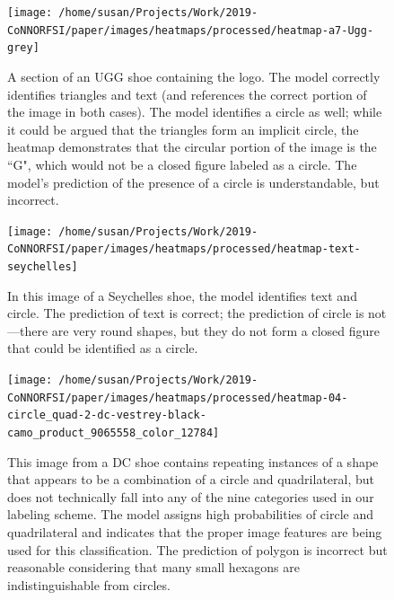 \documentclass{article}\usepackage[]{graphicx}\usepackage[table]{xcolor}
\newenvironment{knitrout}{}{} %
\begin{document}
\begin{knitrout}
\color{fgcolor}\begin{figure}[!p]

{\centering \texttt{[image: /home/susan/Projects/Work/2019-CoNNORFSI/paper/images/heatmaps/processed/heatmap-a7-Ugg-grey]} 

}

\caption{A section of an UGG shoe containing the logo. The model correctly identifies triangles and text (and references the correct portion of the image in both cases). The model identifies a circle as well; while it could be argued that the triangles form an implicit circle, the heatmap demonstrates that the circular portion of the image is the ``G", which would not be a closed figure labeled as a circle. The model's prediction of the presence of a circle is understandable, but incorrect.\label{fig:ugg-heatmap}}\label{fig:current-heatmaps1}
\end{figure}

\begin{figure}[!p]

{\centering \texttt{[image: /home/susan/Projects/Work/2019-CoNNORFSI/paper/images/heatmaps/processed/heatmap-text-seychelles]} 

}

\caption{In this image of a Seychelles shoe, the model identifies text and circle. The prediction of text is correct; the prediction of circle is not---there are very round shapes, but they do not form a closed figure that could be identified as a circle.\label{fig:seychelles-heatmap}}\label{fig:current-heatmaps2}
\end{figure}

\begin{figure}[!p]

{\centering \texttt{[image: /home/susan/Projects/Work/2019-CoNNORFSI/paper/images/heatmaps/processed/heatmap-04-circle\_quad-2-dc-vestrey-black-camo\_product\_9065558\_color\_12784]} 

}

\caption{This image from a DC shoe contains repeating instances of a shape that appears to be a combination of a circle and quadrilateral, but does not technically fall into any of the nine categories used in our labeling scheme. The model assigns high probabilities of circle and quadrilateral and indicates that the proper image features are being used for this classification. The prediction of polygon is incorrect but reasonable considering that many small hexagons are indistinguishable from circles.\label{fig:dc-heatmap}}\label{fig:current-heatmaps3}
\end{figure}


\end{knitrout}
\end{document}
